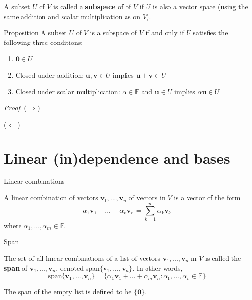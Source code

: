 \documentclass [aspectratio=169]{beamer}
\newcommand{\bu}{{\mathbf{u}}}
\newcommand{\bv}{{\mathbf{v}}}
\newcommand{\zerovec}{{\mathbf{0}}}
\newcommand{\F}{{\mathbb{F}}}
\begin{document}
\begin{frame}

\begin{definition}
A subset $U$ of $V$ is called a \textbf{subspace} of of $V$ if $U$ is also a vector space (using the same addition and scalar multiplication as on $V$).
\end{definition}


\begin{exampleblock}{Proposition}
A subset $U$ of $V$ is a subspace of $V$ if
and only if $U$ satisfies the following three conditions:
\begin{enumerate}
\item  $\zerovec \in U$
\item Closed under addition: $\bu, \bv \in U$ implies $\bu+\bv \in U$
\item Closed under scalar multiplication: $\alpha \in\F$ and $\bu\in U$
implies $\alpha \bu \in U$
\end{enumerate}
\end{exampleblock}
\end{frame}

\begin{frame}
\textit{Proof}.
($\Rightarrow$)

\vspace{3cm}

($\Leftarrow$)

\vspace{3cm}

\end{frame}

\section{Linear (in)dependence and bases}


\begin{frame}{Linear combinations}
\begin{definition}
A linear combination of vectors $\bv_{1},...,\bv_{n}$ of vectors in $V$ is a vector of the form 
$$
\alpha_{1}\bv_{1}+...+\alpha_{n}\bv_{n} = \sum_{k=1}^n \alpha_k \bv_k
$$
 where $\alpha_{1},...,\alpha_{m} \in \F$.
\end{definition}
\end{frame}

\begin{frame}{Span}
\begin{definition}
The set of all linear combinations of a list of vectors
$\bv_{1},...,\bv_{n}$ in $V$ is called the \textbf{span} of $\bv_{1},...,\bv_{n}$,
denoted span$\{\bv_{1},...,\bv_{n}\}$. In other words, 
$$
\text{span}\{\bv_{1},...,\bv_{n}\}=\{\alpha_{1}\bv_{1}+...+\alpha_{m}\bv_{n} :\alpha_{1},...,\alpha_{n}\in\F\}
$$
\end{definition}
The span of the empty list is defined to be $\{\zerovec\}$.



\end{frame}
\end{document}
